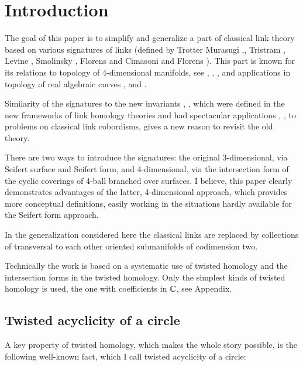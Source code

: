 \documentclass{article}
\numberwithin{equation}{section}
\begin{document}
\section{Introduction}\label{s1}
 
The goal of this paper is to simplify and generalize a part 
of classical link theory based on various signatures of links
(defined by Trotter \cite{Trot} Murasugi \cite{Mura1},\cite{Mura2}, 
Tristram \cite{Trist}, Levine \cite{Levine1} \cite{Levine2}, 
Smolinsky \cite{Smolinsky}, Florens \cite{Florens1} and 
Cimasoni and Florens \cite{CimaFlor}). 
This part is known for its relations to topology of 4-dimensional
manifolds, see \cite{Trist}, \cite{Viro1}, \cite{Viro2} \cite{Gilmer},
\cite{KaufTayl} 
and applications in 
topology of real algebraic curves \cite{Orevkov1}, \cite{Orevkov2} and 
\cite{Florens1}. 

Similarity of the signatures to the new invariants
\cite{Rasm}, \cite{OzsSz1}, 
which were defined in the new frameworks of link homology theories 
and had spectacular applications \cite{Rasm}, \cite{Livingst}, 
\cite{Shum} to problems on classical link cobordisms, gives a new 
reason to revisit the old theory.    

There are two ways to introduce the signatures: 
the original 3-dimensional, via Seifert surface and Seifert form, and
4-dimensional, via the intersection form of the cyclic coverings of
4-ball branched over surfaces. I believe, this paper clearly
demonstrates advantages of the latter, 4-dimensional approach, which
provides more conceptual definitions, easily working in the situations
hardly available for the Seifert form approach. 

In the generalization considered here the classical links are 
replaced by collections  of transversal to each other oriented 
submanifolds of codimension two.

Technically the work is based on a systematic use of twisted homology
and the intersection 
forms in the twisted homology. Only the simplest kinds of 
twisted homology is used, the one with coefficients in $\mathbb C$, see 
Appendix.   

\subsection{Twisted acyclicity of a circle}\label{s1.2} 
A key property of twisted homology, which makes the whole story
possible, is the following well-known fact, which I call 
{\sfit twisted acyclicity of a circle\/}:
\end{document}
